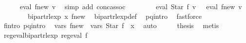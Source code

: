 \begin{isabellebody}
\ \isamarkupfalse%
\ {\isachardoublequoteopen}{\isasymdots}\ {\isacharequal}{\kern0pt}\ {\isasymPsi}\ {\isacharparenleft}{\kern0pt}eval\ {\isacharquery}{\kern0pt}f{\isacharunderscore}{\kern0pt}new\ v{\isacharparenright}{\kern0pt}{\isachardoublequoteclose}\ \isamarkupfalse%
\ {\isacharparenleft}{\kern0pt}simp\ add{\isacharcolon}{\kern0pt}\ conc{\isacharunderscore}{\kern0pt}assoc{\isacharparenright}{\kern0pt}\isanewline
\ \ \ \ \isamarkupfalse%
\ \isamarkupfalse%
\ {\isachardoublequoteopen}{\isasymPsi}\ {\isacharparenleft}{\kern0pt}eval\ {\isacharparenleft}{\kern0pt}Star\ f{\isacharparenright}{\kern0pt}\ v{\isacharparenright}{\kern0pt}\ {\isacharequal}{\kern0pt}\ {\isasymPsi}\ {\isacharparenleft}{\kern0pt}eval\ {\isacharquery}{\kern0pt}f{\isacharunderscore}{\kern0pt}new\ v{\isacharparenright}{\kern0pt}{\isachardoublequoteclose}\ \isakeywordONE{{\isachardot}{\kern0pt}}\isamarkupfalse%
\isanewline
\ \ \isamarkupfalse%
\isanewline
\ \ \isamarkupfalse%
\ \isamarkupfalse%
\ {\isachardoublequoteopen}bipart{\isacharunderscore}{\kern0pt}rlexp\ x\ {\isacharquery}{\kern0pt}f{\isacharunderscore}{\kern0pt}new{\isachardoublequoteclose}\ \isamarkupfalse%
\ bipart{\isacharunderscore}{\kern0pt}rlexp{\isacharunderscore}{\kern0pt}def\ \isamarkupfalse%
\ p{\isacharunderscore}{\kern0pt}q{\isacharunderscore}{\kern0pt}intro\ \isamarkupfalse%
\ fastforce\isanewline
\ \ \isamarkupfalse%
\ \isamarkupfalse%
\ f{\isacharprime}{\kern0pt}{\isacharunderscore}{\kern0pt}intro\ p{\isacharunderscore}{\kern0pt}q{\isacharunderscore}{\kern0pt}intro\ \isamarkupfalse%
\ {\isachardoublequoteopen}vars\ {\isacharquery}{\kern0pt}f{\isacharunderscore}{\kern0pt}new\ {\isacharequal}{\kern0pt}\ vars\ {\isacharparenleft}{\kern0pt}Star\ f{\isacharparenright}{\kern0pt}\ {\isasymunion}\ {\isacharbraceleft}{\kern0pt}x{\isacharbraceright}{\kern0pt}{\isachardoublequoteclose}\ \isamarkupfalse%
\ auto\isanewline
\ \ \isamarkupfalse%
\ \isamarkupfalse%
\ {\isacharquery}{\kern0pt}thesis\ \isamarkupfalse%
\ metis\isanewline
{}\isamarkupfalse%
%
\endisatagproof
{\isafoldproof}%
%
\isadelimproof
\isanewline
%
\endisadelimproof
\isanewline
{}\isamarkupfalse%
\ reg{\isacharunderscore}{\kern0pt}eval{\isacharunderscore}{\kern0pt}bipart{\isacharunderscore}{\kern0pt}rlexp{\isacharcolon}{\kern0pt}\ {\isachardoublequoteopen}reg{\isacharunderscore}{\kern0pt}eval\ f\ {\isasymLongrightarrow}\isanewline

\end{isabellebody}
